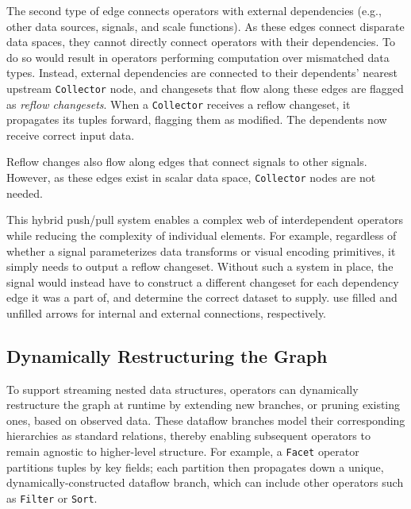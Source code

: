 The second type of edge connects operators with external dependencies (e.g.,
other data sources, signals, and scale functions). As these edges connect
disparate data spaces, they cannot directly connect operators with their
dependencies. To do so would result in operators performing computation over
mismatched data types. Instead, external dependencies are connected to their
dependents' nearest upstream \texttt{Collector} node, and changesets that flow
along these edges are flagged as \emph{reflow changesets}. When a
\texttt{Collector} receives a reflow changeset, it propagates its tuples
forward, flagging them as modified. The dependents now receive correct input
data.

Reflow changes also flow along edges that connect signals to other signals.
However, as these edges exist in scalar data space, \texttt{Collector} nodes are
not needed.

This hybrid push/pull system enables a complex web of interdependent operators
while reducing the complexity of individual elements. For example, regardless of
whether a signal parameterizes data transforms or visual encoding primitives, it
simply needs to output a reflow changeset. Without such a system in place, the
signal would instead have to construct a different changeset for each dependency
edge it was a part of, and determine the correct dataset to supply.
 use filled and unfilled
arrows for internal and external connections, respectively.

\vspace{-20pt}

\subsection{Dynamically Restructuring the Graph}

\vspace{-7pt}

To support streaming nested data structures, operators can dynamically
restructure the graph at runtime by extending new branches, or pruning
existing ones, based on observed data. These dataflow branches model their
corresponding hierarchies as standard relations, thereby enabling subsequent
operators to remain agnostic to higher-level structure. For example, a
\texttt{Facet} operator partitions tuples by key fields; each partition then
propagates down a unique, dynamically-constructed dataflow branch, which can
include other operators such as \texttt{Filter} or \texttt{Sort}.

